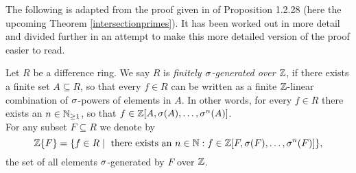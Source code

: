The following is adapted from the proof given in \cite{wibmer} of Proposition 1.2.28 (here the upcoming Theorem \ref{intersectionprimes}). It has been worked out in more detail and divided further in an attempt to make this more detailed version of the proof easier to read.

\begin{defn}
Let $R$ be a difference ring. We say $R$ is \emph{finitely $\sigma$-generated over $\mathbb{Z}$}, if there exists a finite set $A \subseteq R$, so that every $f \in R$ can be written as a finite $\mathbb{Z}$-linear combination of $\sigma$-powers of elements in $A$. In other words,
for every $f \in R$ there exists an $n \in \mathbb{N}_{\geq1}$, so that $f \in \mathbb{Z}[A,\sigma(A),\ldots,\sigma^n(A)]$. \\ 
\indent For any subset $F \subseteq R$ we denote by $$\mathbb{Z}\{F\} = \{ f \in R \mid \text{ there exists an } n \in \mathbb{N}: f \in \mathbb{Z}[F, \sigma(F), \ldots, \sigma^n(F)] \},$$ the set of all elements $\sigma$-generated by $F$ over $\mathbb{Z}$.
\end{defn}

